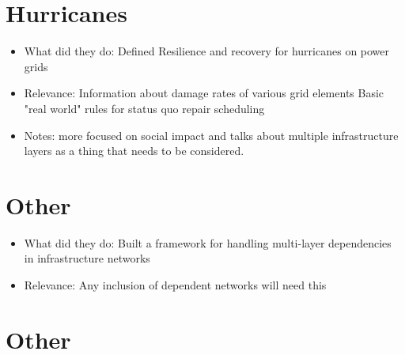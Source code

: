 \documentclass{article}
\begin{document}
	\section{Hurricanes}
	\cite{OuyangEA2014}
	\begin{itemize}
	\item What did they do: \newline
	Defined Resilience and recovery for hurricanes on power grids
	\item Relevance: \newline
	Information about damage rates of various grid elements \newline
	Basic "real world" rules for status quo repair scheduling 
	\item Notes: \newline
	more focused on social impact and talks about multiple infrastructure layers as a thing that needs to be considered.
	\end{itemize}
	\section{Other}
	\cite{SvendsenEA2007}
	\begin{itemize}
		\item What did they do: \newline
		Built a framework for handling multi-layer dependencies in infrastructure networks
		\item Relevance: \newline
		Any inclusion of dependent networks will need this 
	\end{itemize}
	\section{Other}
	
	
	
\end{document}

